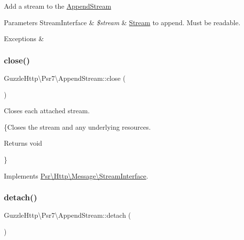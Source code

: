 Add a stream to the \hyperlink{classGuzzleHttp_1_1Psr7_1_1AppendStream}{Append\+Stream}


\begin{DoxyParams}[1]{Parameters}
Stream\+Interface & {\em \$stream} & \hyperlink{classGuzzleHttp_1_1Psr7_1_1Stream}{Stream} to append. Must be readable.\\
\hline
\end{DoxyParams}

\begin{DoxyExceptions}{Exceptions}
{\em } & \\
\hline
\end{DoxyExceptions}
\mbox{\label{classGuzzleHttp_1_1Psr7_1_1AppendStream_acba72b0a13e6b2ad6c6cc2a6eeea47cd}} 
\subsubsection{\texorpdfstring{close()}{close()}}
{\footnotesize\ttfamily Guzzle\+Http\textbackslash{}\+Psr7\textbackslash{}\+Append\+Stream\+::close (\begin{DoxyParamCaption}{ }\end{DoxyParamCaption})}

Closes each attached stream.

\{Closes the stream and any underlying resources.

\begin{DoxyReturn}{Returns}
void
\end{DoxyReturn}
\} 

Implements \hyperlink{interfacePsr_1_1Http_1_1Message_1_1StreamInterface_a0bbd0c821da0ee0c319f9867ff77c598}{Psr\textbackslash{}\+Http\textbackslash{}\+Message\textbackslash{}\+Stream\+Interface}.

\mbox{\label{classGuzzleHttp_1_1Psr7_1_1AppendStream_aa62ff3e927b78109c54708c10f124de0}} 
\subsubsection{\texorpdfstring{detach()}{detach()}}
{\footnotesize\ttfamily Guzzle\+Http\textbackslash{}\+Psr7\textbackslash{}\+Append\+Stream\+::detach (\begin{DoxyParamCaption}{ }\end{DoxyParamCaption})}

